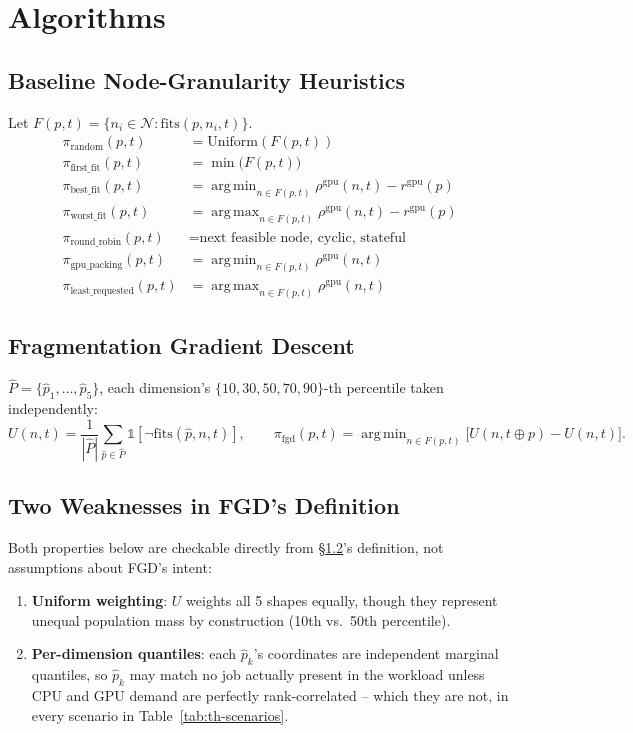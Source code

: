 \documentclass[12pt]{report}
\newcommand{\N}{\mathcal{N}}
\DeclareMathOperator*{\argmin}{arg\,min}
\DeclareMathOperator*{\argmax}{arg\,max}
\begin{document}
\chapter{Algorithms}
\label{ch:algorithms}

\section{Baseline Node-Granularity Heuristics}
Let $F(p,t)=\{n_i\in\N:\mathrm{fits}(p,n_i,t)\}$.
\begin{align*}
  \pi_{\text{random}}(p,t) &= \text{Uniform}(F(p,t)) \\
  \pi_{\text{first\_fit}}(p,t) &= \min\big(F(p,t)\big) \\
  \pi_{\text{best\_fit}}(p,t) &= \argmin_{n\in F(p,t)}\rho^{\text{gpu}}(n,t)-r^{\text{gpu}}(p) \\
  \pi_{\text{worst\_fit}}(p,t) &= \argmax_{n\in F(p,t)}\rho^{\text{gpu}}(n,t)-r^{\text{gpu}}(p) \\
  \pi_{\text{round\_robin}}(p,t) &= \text{next feasible node, cyclic, stateful} \\
  \pi_{\text{gpu\_packing}}(p,t) &= \argmin_{n\in F(p,t)}\rho^{\text{gpu}}(n,t) \\
  \pi_{\text{least\_requested}}(p,t) &= \argmax_{n\in F(p,t)}\rho^{\text{gpu}}(n,t)
\end{align*}

\section{Fragmentation Gradient Descent}
\label{sec:th-fgd-def}
$\hat P=\{\hat p_1,\dots,\hat p_5\}$, each dimension's
$\{10,30,50,70,90\}$-th percentile taken independently:
\[
  U(n,t)=\frac{1}{|\hat P|}\sum_{\hat p\in\hat P}\mathbb{1}[\neg\mathrm{fits}(\hat p,n,t)],
  \qquad
  \pi_{\text{fgd}}(p,t)=\argmin_{n\in F(p,t)}\big[U(n,t{\oplus}p)-U(n,t)\big].
\]

\section{Two Weaknesses in FGD's Definition}
\label{sec:th-fgd-weak}
Both properties below are checkable directly from \S\ref{sec:th-fgd-def}'s
definition, not assumptions about FGD's intent:
\begin{enumerate}[leftmargin=1.4em]
\item \textbf{Uniform weighting}: $U$ weights all 5 shapes equally,
  though they represent unequal population mass by construction (10th
  vs.\ 50th percentile).
\item \textbf{Per-dimension quantiles}: each $\hat p_k$'s coordinates are
  independent marginal quantiles, so $\hat p_k$ may match no job actually
  present in the workload unless CPU and GPU demand are perfectly
  rank-correlated -- which they are not, in every scenario in
  Table~\ref{tab:th-scenarios}.
\end{enumerate}
\end{document}
